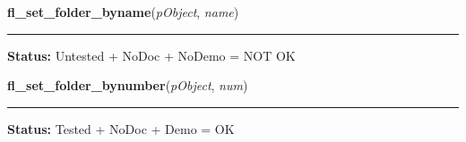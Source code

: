     \label{xformslib:library:fl_set_folder_byname}

    \vspace{0.5ex}

\hspace{.8\funcindent}\begin{boxedminipage}{\funcwidth}

    \raggedright \textbf{fl\_set\_folder\_byname}(\textit{pObject}, \textit{name})

    \vspace{-1.5ex}

    \rule{\textwidth}{0.5\fboxrule}
\setlength{\parskip}{2ex}
\setlength{\parskip}{1ex}
\textbf{Status:} Untested + NoDoc + NoDemo = NOT OK



    \end{boxedminipage}

    \label{xformslib:library:fl_set_folder_bynumber}

    \vspace{0.5ex}

\hspace{.8\funcindent}\begin{boxedminipage}{\funcwidth}

    \raggedright \textbf{fl\_set\_folder\_bynumber}(\textit{pObject}, \textit{num})

    \vspace{-1.5ex}

    \rule{\textwidth}{0.5\fboxrule}
\setlength{\parskip}{2ex}
\setlength{\parskip}{1ex}
\textbf{Status:} Tested + NoDoc + Demo = OK



    \end{boxedminipage}

    \label{xformslib:library:fl_get_folder}

    \vspace{0.5ex}

